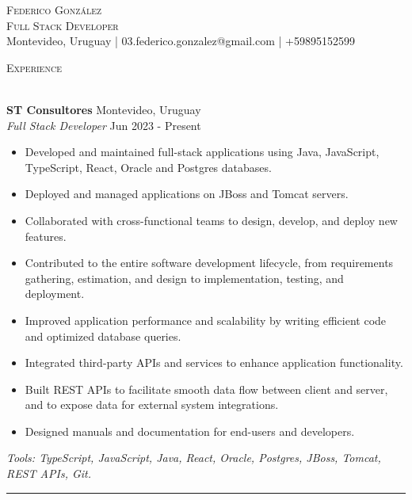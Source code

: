\documentclass[11pt,a4paper]{article}
\newcommand{\lineunder} {
    \vspace*{-8pt} \\
    \hspace*{-18pt} \hrulefill \\
}
\newcommand{\header} [1] {
    {\hspace*{-18pt}\vspace*{6pt} \textsc{#1}}
    \vspace*{-6pt} \lineunder
}
\begin{document}
\vspace*{-34pt}

    

\vspace*{-10pt}
\begin{center}
	{\Huge \scshape {Federico González}}\\
    {\large \scshape {Full Stack Developer}}\\
	Montevideo, Uruguay | 03.federico.gonzalez@gmail.com | +59895152599\\
\end{center}

\header{Experience}
\vspace{0mm}

\textbf{ST Consultores} \hfill Montevideo, Uruguay\\
\textit{Full Stack Developer} \hfill Jun 2023 - Present\\
\vspace{-1mm}
\begin{itemize} \itemsep -1pt
	\item Developed and maintained full-stack applications using Java, JavaScript, TypeScript, React, Oracle and Postgres databases.
	\item Deployed and managed applications on JBoss and Tomcat servers.
	\item Collaborated with cross-functional teams to design, develop, and deploy new features.
	\item Contributed to the entire software development lifecycle, from requirements gathering, estimation, and design to implementation, testing, and deployment.
	\item Improved application performance and scalability by writing efficient code and optimized database queries.
	\item Integrated third-party APIs and services to enhance application functionality.
	\item Built REST APIs to facilitate smooth data flow between client and server, and to expose data for external system integrations.
	\item Designed manuals and documentation for end-users and developers.
\end{itemize}
\vspace{-1mm}
\textit{Tools: TypeScript, JavaScript, Java, React, Oracle, Postgres, JBoss, Tomcat, REST APIs, Git.}

\vspace{1.5mm}
\hrule
\vspace{1.5mm}
\end{document}
